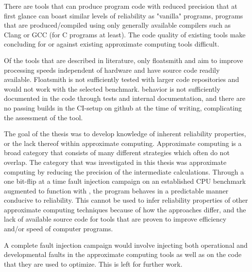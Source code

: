 
There are tools that can produce program code with reduced precision that at first glance can boast similar levels of reliability as "vanilla" programs, programs that are produced/compiled using only generally available compilers such as Clang or GCC (for C programs at least). 
The code quality of existing tools make concluding for or against existing approximate computing tools difficult. 

Of the tools that are described in literature, only floatsmith and \taffo{} aim to improve processing speeds independent of hardware and have source code readily available. Floatsmith is not sufficiently tested with larger code repositories and would not work with the selected benchmark.\taffo{} behavior is not sufficiently documented in the code through tests and internal documentation, and there are no passing builds in the CI-setup on github at the time of writing, complicating the assessment of the tool.

The goal of the thesis was to develop knowledge of inherent reliability properties, or the lack thereof within approximate computing. Approximate computing is a broad category that consists of many different strategies which often do not overlap. The category that was investigated in this thesis was approximate computing by reducing the precision of the intermediate calculations. Through a one bit-flip at a time fault injection campaign on an established CPU benchmark augmented to function with \taffo{}, the program behaves in a predictable manner conducive to reliability. This cannot be used to infer reliability properties of other approximate computing techniques because of how the approaches differ, and the lack of available source code for  tools that are proven to improve efficiency and/or speed of computer programs. 

A complete fault injection campaign would involve injecting both operational and developmental faults in the approximate computing tools as well as on the code that they are used to optimize. This is left for further work. 